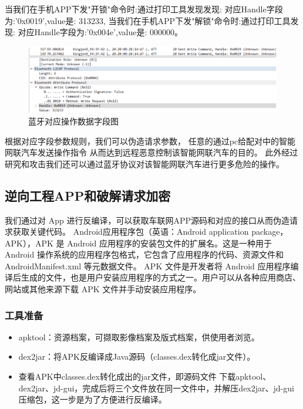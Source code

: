当我们在手机APP下发"开锁"命令时:通过打印工具发现发现:
对应Handle字段为:'0x0019',value是: 313233,
当我们在手机APP下发"解锁"命令时:通过打印工具发现:
对应Handle字段为:'0x004e',value是: 000000。
\begin{figure}
    \centering
    \includegraphics[scale=0.5]{resources/img/i18.png}
    \caption{蓝牙对应操作数据字段图}
  \end{figure}
根据对应字段参数规则，我们可以伪造请求参数\cite{lu2005conditional}，
任意的通过pc给配对中的智能网联汽车发送操作指令
从而达到远程恶意控制该智能网联汽车的目的。
此外经过研究和攻击我们还可以通过蓝牙协议对该智能网联汽车进行更多危险的操作。

\subsection{逆向工程APP和破解请求加密}
我们通过对 App 进行反编译\cite{yang2015automated}，可以获取车联网APP源码和对应的接口从而伪造请求获取关键代码。
Android应用程序包（英语：Android application package，APK），APK 是 Android 应用程序的安装包文件的扩展名。这是一种用于 Android 操作系统的应用程序包格式，它包含了应用程序的代码、资源文件和 AndroidManifest.xml 等元数据文件。
APK 文件是开发者将 Android 应用程序编译后生成的文件，也是用户安装应用程序的方式之一。用户可以从各种应用商店、网站或其他来源下载 APK 文件并手动安装应用程序。

\subsubsection{工具准备}
\begin{itemize}
    \item apktool：资源档案，可撷取影像档案及版式档案，供使用者浏览。        
    \item dex2jar：将APK反编译成Java源码（classes.dex转化成jar文件）。
    \item 查看APK中classes.dex转化成出的jar文件，即源码文件 下载apktool、dex2jar、jd-gui，完成后将三个文件放在同一文件中，并解压dex2jar、jd-gui压缩包，这一步是为了方便进行反编译。
\end{itemize}

